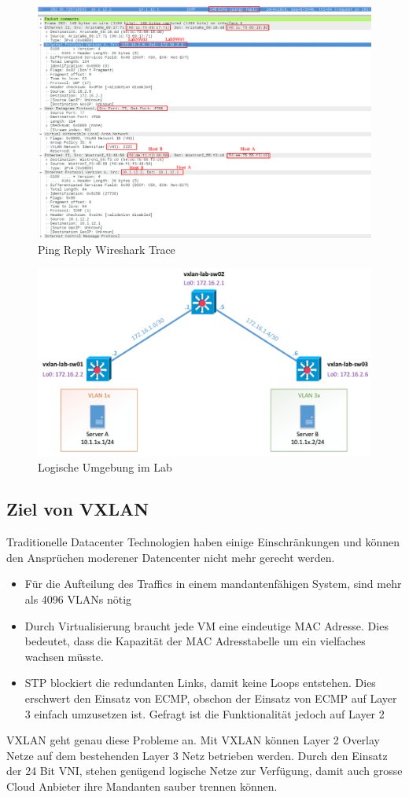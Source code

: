 \begin{figure}[h]
	\centering
	\includegraphics[width=0.8\linewidth]{images/ping_replay}
	\caption{Ping Reply Wireshark Trace}
	\label{fig:pingreply}
\end{figure}

\begin{figure}[h]
	\centering
	\includegraphics[width=0.6\linewidth]{images/vxlan_logical}
	\caption{Logische Umgebung im Lab}
	\label{fig:vxlanlogical}
\end{figure}
\newpage

\subsection{Ziel von VXLAN}
Traditionelle Datacenter Technologien haben einige Einschränkungen und können den Ansprüchen moderener Datencenter nicht mehr gerecht werden. 
\begin{itemize}
	\item Für die Aufteilung des Traffics in einem mandantenfähigen System, sind mehr als 4096 VLANs nötig
	\item Durch Virtualisierung braucht jede VM eine eindeutige MAC Adresse. Dies bedeutet, dass die Kapazität der MAC Adresstabelle um ein vielfaches wachsen müsste. 
	\item STP blockiert die redundanten Links, damit keine Loops entstehen. Dies erschwert den Einsatz von ECMP, obschon der Einsatz von ECMP auf Layer 3 einfach umzusetzen ist. Gefragt ist die Funktionalität jedoch auf Layer 2
\end{itemize}
VXLAN geht genau diese Probleme an. Mit VXLAN können Layer 2 Overlay Netze auf dem bestehenden Layer 3 Netz betrieben werden. Durch den Einsatz der 24 Bit VNI, stehen genügend logische Netze zur Verfügung, damit auch grosse Cloud Anbieter ihre Mandanten sauber trennen können. 


